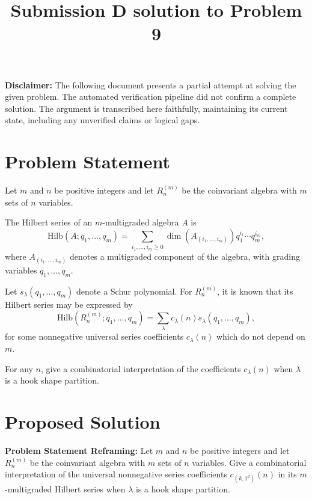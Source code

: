 \title{Submission D solution to Problem 9}
\date{}
\maketitle


\begin{center}
    \textbf{Disclaimer:} The following document presents a partial attempt at solving the given problem. The automated verification pipeline did not confirm a complete solution. The argument is transcribed here faithfully, maintaining its current state, including any unverified claims or logical gaps.
\end{center}

\section*{Problem Statement}

Let $m$ and $n$ be positive integers and let $R_n^{(m)}$ be the coinvariant algebra with $m$ sets of $n$ variables.

The Hilbert series of an $m$-multigraded algebra $A$ is
\[
\mathrm{Hilb}(A;q_1,\ldots ,q_m)= \sum_{i_1,\ldots,i_m \geq 0} \dim(A_{(i_1,\ldots,i_m)})q_1^{i_1} \cdots q_m^{i_m},
\]
where $A_{(i_1,\ldots,i_m)}$ denotes a multigraded component of the algebra, with grading variables $q_1,\ldots, q_m$.

Let $s_\lambda(q_1,\ldots ,q_m)$ denote a Schur polynomial. For $R_n^{(m)}$, it is known that its Hilbert series may be expressed by 
\[
\mathrm{Hilb}(R_n^{(m)};q_1,\ldots ,q_m)= \sum_{\lambda}
c_{\lambda}(n)s_\lambda(q_1,\ldots ,q_m),
\]
for some nonnegative universal series coefficients $c_\lambda(n)$ which do not depend on $m$.

For any $n$, give a combinatorial interpretation of the coefficients $c_{\lambda}(n)$ when $\lambda$ is a hook shape partition.

\section*{Proposed Solution}

\textbf{Problem Statement Reframing:} Let $m$ and $n$ be positive integers and let $R_n^{(m)}$ be the coinvariant algebra with $m$ sets of $n$ variables. Give a combinatorial interpretation of the universal nonnegative series coefficients $c_{(k, 1^d)}(n)$ in its $m$-multigraded Hilbert series when $\lambda$ is a hook shape partition.

